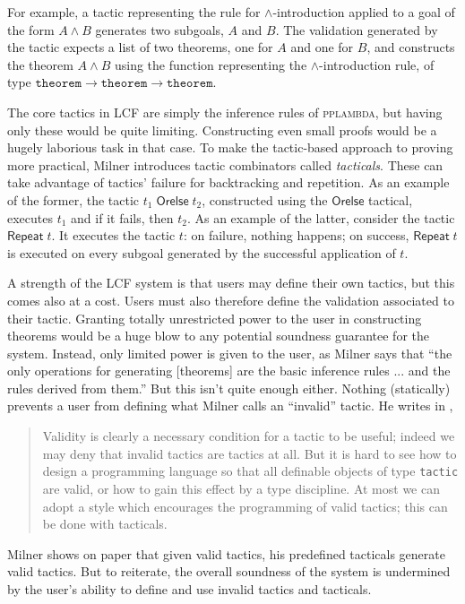 \newcommand{\theorem}{\mathtt{theorem}}
For example, a tactic representing the rule for $\land$-introduction
applied to a goal of the form $A \land B$ generates two subgoals, $A$ and
$B$.
The validation generated by the tactic expects a list of two theorems, one for
$A$ and one for $B$, and constructs the theorem $A \land B$ using the function
representing the $\land$-introduction rule,
of type $\theorem \to \theorem \to \theorem$.

The core tactics in LCF are simply the inference rules of \textsc{pplambda}, but
having only these would be quite limiting.
Constructing even small proofs would be a hugely laborious task in that case.
To make the tactic-based approach to proving more practical, Milner
introduces tactic combinators called \emph{tacticals}.
These can take advantage of tactics' failure for backtracking and
repetition.
As an example of the former, the tactic $t_1 \;\mathsf{Orelse}\; t_2$,
constructed using the $\mathsf{Orelse}$ tactical, executes $t_1$ and if it
fails, then $t_2$.
As an example of the latter, consider the tactic $\mathsf{Repeat}\; t$.
It executes the tactic $t$:
on failure, nothing happens;
on success, $\mathsf{Repeat}\; t$ is executed on every subgoal generated by the
successful application of $t$.

A strength of the LCF system is that users may define their own tactics, but
this comes also at a cost.
Users must also therefore define the validation associated to their tactic.
Granting totally unrestricted power to the user in constructing theorems would
be a huge blow to any potential soundness guarantee for the system.
Instead, only limited power is given to the user, as Milner says that
``the only operations for generating [theorems] are the basic
inference rules ... and the rules derived from them.''
But this isn't quite enough either.
Nothing (statically) prevents a user from defining what Milner calls an
``invalid'' tactic.
%
He writes in \cite{lcf},
\begin{quote}
  Validity is clearly a necessary condition for a tactic to be useful; indeed we
  may deny that invalid tactics are tactics at all.  But it is hard to see how
  to design a programming language so that all definable objects of type
  \texttt{tactic} are valid, or how to gain this effect by a type discipline.
  At most we can adopt a style which encourages the programming of valid
  tactics; this can be done with tacticals.
\end{quote}
%
Milner shows on paper that given valid tactics, his predefined tacticals
generate valid tactics. But to reiterate, the overall soundness of the system is
undermined by the user's ability to define and use invalid tactics and
tacticals.

